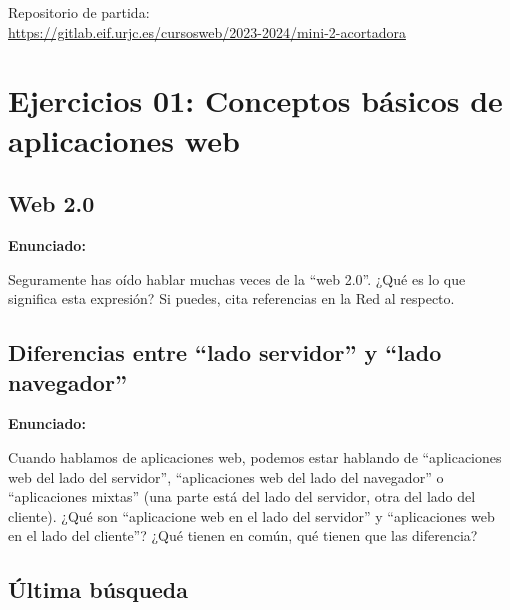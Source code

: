 Repositorio de partida: \\
\url{https://gitlab.eif.urjc.es/cursosweb/2023-2024/mini-2-acortadora}

\newpage


\section{Ejercicios 01: Conceptos básicos de aplicaciones web}

\subsection{Web 2.0}
\label{subsec:web-20}

\textbf{Enunciado:}

Seguramente has oído hablar muchas veces de la ``web 2.0''. ¿Qué es lo que significa esta expresión? Si puedes, cita referencias en la Red al respecto.

\subsection{Diferencias entre ``lado servidor'' y ``lado navegador''}
\label{subsec:appweb-servidor-navegador}

\textbf{Enunciado:}

Cuando hablamos de aplicaciones web, podemos estar hablando de ``aplicaciones web del lado del servidor'', ``aplicaciones web del lado del navegador'' o ``aplicaciones mixtas'' (una parte está del lado del servidor, otra del lado del cliente). ¿Qué son ``aplicacione web en el lado del servidor'' y ``aplicaciones web en el lado del cliente''? ¿Qué tienen en común, qué tienen que las diferencia? 

\subsection{Última búsqueda}
\label{subsec:ultima-busqueda}

